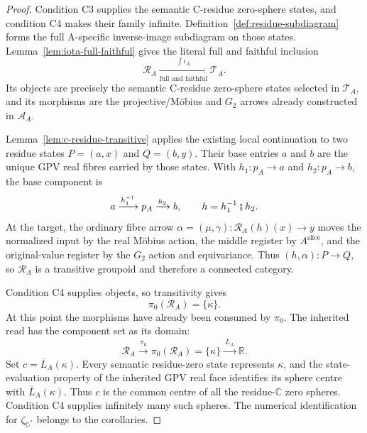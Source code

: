 \documentclass[11pt]{article}
\newcommand{\OO}{\mathbb{O}}
\newcommand{\CC}{\mathbb{C}}
\newcommand{\RR}{\mathbb{R}}
\newcommand{\Ostar}{\OO^{*}}
\newcommand{\zetaO}{\zeta_{\Ostar}}
\theoremstyle{plain}
\theoremstyle{definition}
\theoremstyle{remark}
\begin{document}
\begin{proof}
Condition \textup{C3} supplies the semantic C-residue zero-sphere states,
and condition \textup{C4} makes their family infinite.
Definition~\ref{def:residue-subdiagram} forms the full A-specific
inverse-image subdiagram on those states. Lemma~\ref{lem:iota-full-faithful}
gives the literal full and faithful inclusion
\[
 \mathcal R_A
   \xrightarrow[\text{full and faithful}]{\ \int\iota_A\ }
 \mathcal T_A .                                      \tag{I}\label{eq:concentricity-total-inclusion}
\]
Its objects are precisely the semantic C-residue zero-sphere states
selected in $\mathcal T_A$, and its morphisms are the projective/M\"obius and
$G_2$ arrows already constructed in $\mathcal A_A$.

Lemma~\ref{lem:c-residue-transitive} applies the existing local continuation
to two residue states $P=(a,x)$ and $Q=(b,y)$. Their base entries $a$ and
$b$ are the unique GPV real fibres carried by those states. With
$h_1:p_A\to a$ and $h_2:p_A\to b$, the base component is
\[
  a\xrightarrow{h_1^{-1}}p_A\xrightarrow{h_2}b,
  \qquad h=h_1^{-1}\fatsemi h_2.
\]
At the target, the ordinary fibre arrow
$\alpha=(\mu,\gamma):\mathcal R_A(h)(x)\to y$ moves the normalized input
by the real M\"obius action, the middle register by $A^{\mathrm{slice}}$,
and the original-value register by the $G_2$ action and equivariance. Thus
$(h,\alpha):P\to Q$, so $\mathcal R_A$ is a transitive groupoid and
therefore a connected category.

Condition \textup{C4} supplies objects, so transitivity gives
\[
  \pi_0(\mathcal R_A)=\{\kappa\}.
                                                        \tag{$\pi$}\label{eq:residue-total-singleton}
\]
At this point the morphisms have already been consumed by $\pi_0$. The
inherited read has the component set as its domain:
\[
  \mathcal R_A\xrightarrow{\ \pi_0\ }\pi_0(\mathcal R_A)=\{\kappa\}
       \xrightarrow{\ \overline L_A\ }\RR.
                                                        \tag{Read}\label{eq:residue-readout-chain}
\]
Set $c=\overline L_A(\kappa)$. Every semantic residue-zero state represents
$\kappa$, and the state-evaluation property of the inherited GPV real face
identifies its sphere centre with $\overline L_A(\kappa)$. Thus $c$ is the
common centre of all the residue-$\CC$ zero spheres. Condition \textup{C4}
supplies infinitely many such spheres.
The numerical identification for $\zetaO$ belongs to the corollaries.
\end{proof}
\end{document}
